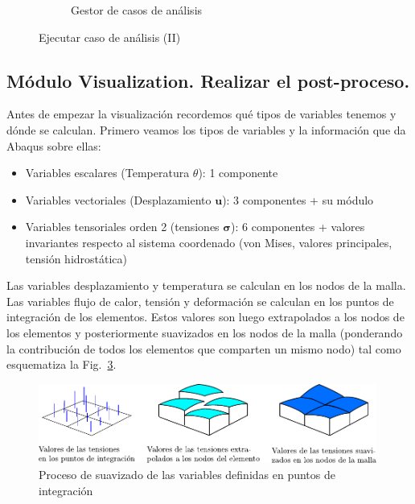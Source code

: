 \begin{enumerate}
\begin{figure}[H]
\begin{subfigure}{0.49\textwidth}
      \caption{Gestor de casos de análisis}
      \label{figu68}
    \end{subfigure}%
    \caption{Ejecutar caso de análisis (II)}
  \end{figure}
\end{enumerate}
\newpage
\subsection{Módulo Visualization. Realizar el post-proceso.}

Antes de empezar la visualización recordemos qué tipos de variables
tenemos y dónde se calculan. Primero veamos los tipos de variables y
la información que da Abaqus sobre ellas:
\begin{itemize}
\item Variables escalares (Temperatura $\theta$): 1 componente
\item Variables vectoriales (Desplazamiento $\mathbf{u}$): 3
  componentes + su módulo
\item Variables tensoriales orden 2 (tensiones $\bm{\sigma}$): 6
  componentes + valores invariantes respecto al sistema coordenado
  (von Mises, valores principales, tensión hidrostática)
\end{itemize}

Las variables desplazamiento y temperatura se calculan en los nodos de
la malla. Las variables flujo de calor, tensión y deformación se
calculan en los puntos de integración de los elementos. Estos valores
son luego extrapolados a los nodos de los elementos y posteriormente
suavizados en los nodos de la malla (ponderando la contribución de
todos los elementos que comparten un mismo nodo) tal como esquematiza
la Fig.~\ref{figu69}.
\begin{figure}[H]
  \centering
  \includegraphics[width=0.99\textwidth]{./body/images/imagen69}
  \caption{Proceso de suavizado de las variables definidas en puntos
    de integración}
  \label{figu69}
\end{figure}

